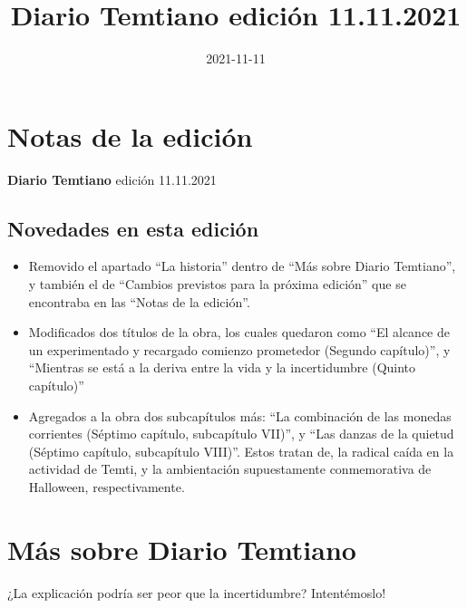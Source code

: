 \documentclass[
  spanish,
]{book}
\title{Diario Temtiano edición 11.11.2021}
\author{}
\date{\vspace{-2.5em}2021-11-11}
\begin{document}
\maketitle

{
\setcounter{tocdepth}{1}
\tableofcontents
}
\hypertarget{notas-de-la-ediciuxf3n}{%
\chapter*{Notas de la edición}\label{notas-de-la-ediciuxf3n}}

\textbf{Diario Temtiano} edición 11.11.2021

\hypertarget{novedades-en-esta-ediciuxf3n}{%
\section*{Novedades en esta edición}\label{novedades-en-esta-ediciuxf3n}}

\begin{itemize}
\item
  Removido el apartado ``La historia'' dentro de ``Más sobre Diario Temtiano'', y también el de ``Cambios previstos para la próxima edición'' que se encontraba en las ``Notas de la edición''.
\item
  Modificados dos títulos de la obra, los cuales quedaron como ``El alcance de un experimentado y recargado comienzo prometedor (Segundo capítulo)'', y ``Mientras se está a la deriva entre la vida y la incertidumbre (Quinto capítulo)''
\item
  Agregados a la obra dos subcapítulos más: ``La combinación de las monedas corrientes (Séptimo capítulo, subcapítulo VII)'', y ``Las danzas de la quietud (Séptimo capítulo, subcapítulo VIII)''. Estos tratan de, la radical caída en la actividad de Temti, y la ambientación supuestamente conmemorativa de Halloween, respectivamente.
\end{itemize}

\hypertarget{muxe1s-sobre-diario-temtiano}{%
\chapter*{Más sobre Diario Temtiano}\label{muxe1s-sobre-diario-temtiano}}

¿La explicación podría ser peor que la incertidumbre? Intentémoslo!
\end{document}

